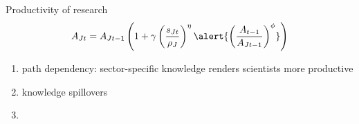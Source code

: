 \documentclass[11pt,aspectratio=169]{beamer}
\begin{document}
		\addtocounter{framenumber}{-1}
		\begin{frame}{Productivity of research}
			\large
			\begin{align*}
				A_{Jt}={A_{Jt-1}}\left(1+\gamma\left(\frac{s_{Jt}}{\rho_J}\right)^\eta\alert{\left(\frac{A_{t-1}}{A_{Jt-1}}\right)^\phi}\right)
			\end{align*}
			\normalsize
			\begin{enumerate}
				\item path dependency: sector-specific knowledge renders scientists more productive
				\item \alert{knowledge spillovers} %
				\item[] %
			\end{enumerate}
		\end{frame}
		
\end{document}
